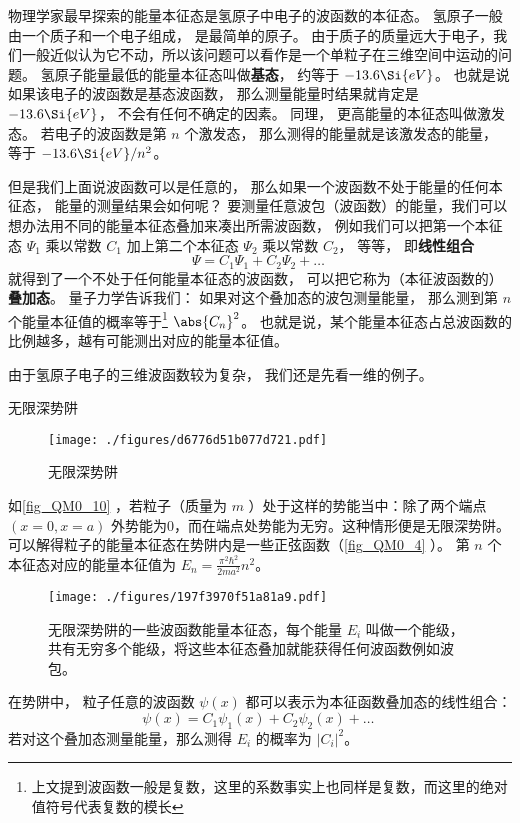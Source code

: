 物理学家最早探索的能量本征态是氢原子中电子的波函数的本征态。 氢原子一般由一个质子和一个电子组成， 是最简单的原子。 由于质子的质量远大于电子，我们一般近似认为它不动，所以该问题可以看作是一个单粒子在三维空间中运动的问题。 氢原子能量最低的能量本征态叫做\textbf{基态}， 约等于 $-13.6\Si{eV}$。 也就是说如果该电子的波函数是基态波函数， 那么测量能量时结果就肯定是 $-13.6\Si{eV}$， 不会有任何不确定的因素。 同理， 更高能量的本征态叫做激发态。 若电子的波函数是第 $n$ 个激发态， 那么测得的能量就是该激发态的能量， 等于 $-13.6\Si{eV}/n^2$。

但是我们上面说波函数可以是任意的， 那么如果一个波函数不处于能量的任何本征态， 能量的测量结果会如何呢？ 要测量任意波包（波函数）的能量，我们可以想办法用不同的能量本征态叠加来凑出所需波函数， 例如我们可以把第一个本征态 $\Psi_1$ 乘以常数 $C_1$ 加上第二个本征态 $\Psi_2$ 乘以常数 $C_2$， 等等， 即\textbf{线性组合}
\begin{equation}
\Psi = C_1\Psi_1 + C_2\Psi_2 + \dots~
\end{equation}
就得到了一个不处于任何能量本征态的波函数， 可以把它称为（本征波函数的）\textbf{叠加态}。 量子力学告诉我们： 如果对这个叠加态的波包测量能量， 那么测到第 $n$ 个能量本征值的概率等于\footnote{上文提到波函数一般是复数，这里的系数事实上也同样是复数，而这里的绝对值符号代表复数的模长} $\abs{C_n}^2$。 也就是说，某个能量本征态占总波函数的比例越多，越有可能测出对应的能量本征值。

由于氢原子电子的三维波函数较为复杂， 我们还是先看一维的例子。

\begin{example}{无限深势阱}
\begin{figure}[ht]
\centering
\texttt{[image: ./figures/d6776d51b077d721.pdf]}
\caption{无限深势阱} \label{fig_QM0_10}
\end{figure}
如\autoref{fig_QM0_10} ，若粒子（质量为 $m$ ）处于这样的势能当中：除了两个端点 $(x=0,x=a)$ 外势能为0，而在端点处势能为无穷。这种情形便是无限深势阱。 可以解得粒子的能量本征态在势阱内是一些正弦函数（\autoref{fig_QM0_4} ）。 第 $n$ 个本征态对应的能量本征值为 $E_n=\frac{\pi^2\hbar^2}{2ma^2}n^2$。

\begin{figure}[ht]
\centering
\texttt{[image: ./figures/197f3970f51a81a9.pdf]}
\caption{无限深势阱的一些波函数能量本征态，每个能量 $E_i$ 叫做一个能级，共有无穷多个能级，将这些本征态叠加就能获得任何波函数例如波包。} \label{fig_QM0_4}
\end{figure}

在势阱中， 粒子任意的波函数 $\psi(x)$ 都可以表示为本征函数叠加态的线性组合：
\begin{equation}
\psi(x) = C_1\psi_1(x) + C_2\psi_2(x) + \dots~
\end{equation}
若对这个叠加态测量能量，那么测得 $E_i$ 的概率为 $|C_i|^2$。
\end{example}


